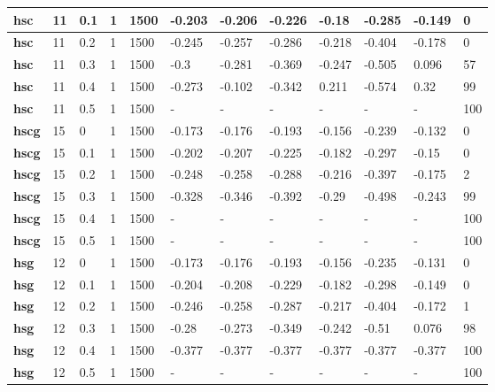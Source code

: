 \begin{longtable}[h]{|p{0.8cm}|p{1.5cm}|p{1cm}|p{1cm}|p{1cm}|p{1cm}|p{1cm}|p{1cm}|p{1cm}|p{1cm}|p{1cm}|p{1.5cm}|}
    \\ \hline
  \textbf{hsc } &  11         & 0.1 & 1 & 1500 & -0.203 & -0.206 & -0.226 &  -0.18 & -0.285 & -0.149 &   0
    \\ \hline
  \textbf{hsc } &  11         & 0.2 & 1 & 1500 & -0.245 & -0.257 & -0.286 & -0.218 & -0.404 & -0.178 &   0
    \\ \hline
  \textbf{hsc } &  11         & 0.3 & 1 & 1500 &   -0.3 & -0.281 & -0.369 & -0.247 & -0.505 &  0.096 &  57
    \\ \hline
  \textbf{hsc } &  11         & 0.4 & 1 & 1500 & -0.273 & -0.102 & -0.342 &  0.211 & -0.574 &   0.32 &  99
    \\ \hline
  \textbf{hsc } &  11         & 0.5 & 1 & 1500 & - & - & - & - & - & - & 100
    \\ \hline
  \textbf{hscg} &  15         &   0 & 1 & 1500 & -0.173 & -0.176 & -0.193 & -0.156 & -0.239 & -0.132 &   0
    \\ \hline
  \textbf{hscg} &  15         & 0.1 & 1 & 1500 & -0.202 & -0.207 & -0.225 & -0.182 & -0.297 &  -0.15 &   0
    \\ \hline
  \textbf{hscg} &  15         & 0.2 & 1 & 1500 & -0.248 & -0.258 & -0.288 & -0.216 & -0.397 & -0.175 &   2
    \\ \hline
  \textbf{hscg} &  15         & 0.3 & 1 & 1500 & -0.328 & -0.346 & -0.392 &  -0.29 & -0.498 & -0.243 &  99
    \\ \hline
  \textbf{hscg} &  15         & 0.4 & 1 & 1500 & - & - & - & - & - & - & 100
    \\ \hline
  \textbf{hscg} &  15         & 0.5 & 1 & 1500 & - & - & - & - & - & - & 100
    \\ \hline
  \textbf{hsg } &  12         &   0 & 1 & 1500 & -0.173 & -0.176 & -0.193 & -0.156 & -0.235 & -0.131 &   0
    \\ \hline
  \textbf{hsg } &  12         & 0.1 & 1 & 1500 & -0.204 & -0.208 & -0.229 & -0.182 & -0.298 & -0.149 &   0
    \\ \hline
  \textbf{hsg } &  12         & 0.2 & 1 & 1500 & -0.246 & -0.258 & -0.287 & -0.217 & -0.404 & -0.172 &   1
    \\ \hline
  \textbf{hsg } &  12         & 0.3 & 1 & 1500 &  -0.28 & -0.273 & -0.349 & -0.242 &  -0.51 &  0.076 &  98
    \\ \hline
  \textbf{hsg } &  12         & 0.4 & 1 & 1500 & -0.377 & -0.377 & -0.377 & -0.377 & -0.377 & -0.377 & 100
    \\ \hline
  \textbf{hsg } &  12         & 0.5 & 1 & 1500 & - & - & - & - & - & - & 100
    \\ \hline
 \end{longtable}
